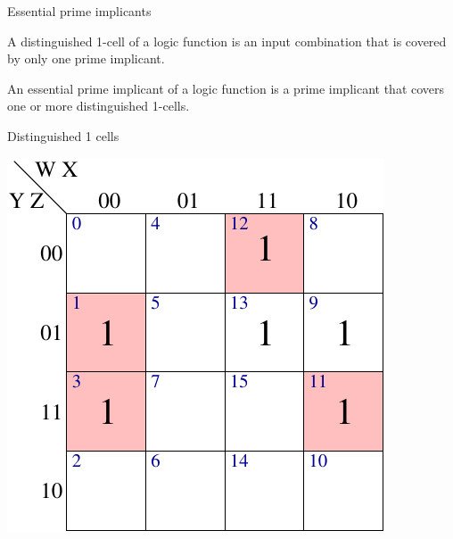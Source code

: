 \begin{frame}{Essential prime implicants}
  \begin{definition}
    A \alert{distinguished 1-cell} of a logic function is an input combination that is covered by only one prime implicant.
  \end{definition}
  \begin{definition}
    An \alert{essential prime implicant} of a logic function is a prime implicant that covers one or more distinguished 1-cells.
  \end{definition}
\end{frame}

\begin{frame}{Distinguished 1 cells}
  \begin{center}
    \includegraphics[scale=0.7]{4VariableKMapExampleDistinguished1Cells}
  \end{center}
\end{frame}

